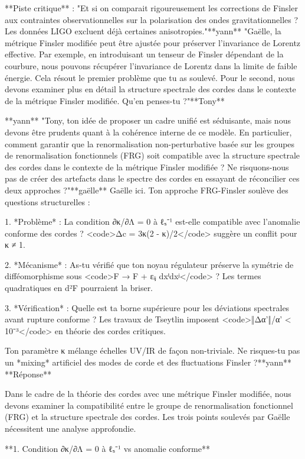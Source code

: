 **Piste critique** :  
"Et si on comparait rigoureusement les corrections de Finsler aux contraintes observationnelles sur la polarisation des ondes gravitationnelles ? Les données LIGO excluent déjà certaines anisotropies."**yann**
"Gaëlle, la métrique Finsler modifiée peut être ajustée pour préserver l'invariance de Lorentz effective. Par exemple, en introduisant un tenseur de Finsler dépendant de la courbure, nous pouvons récupérer l'invariance de Lorentz dans la limite de faible énergie. Cela résout le premier problème que tu as soulevé. Pour le second, nous devons examiner plus en détail la structure spectrale des cordes dans le contexte de la métrique Finsler modifiée. Qu'en penses-tu ?"**Tony**

**yann**
"Tony, ton idée de proposer un cadre unifié est séduisante, mais nous devons être prudents quant à la cohérence interne de ce modèle. En particulier, comment garantir que la renormalisation non-perturbative basée sur les groupes de renormalisation fonctionnels (FRG) soit compatible avec la structure spectrale des cordes dans le contexte de la métrique Finsler modifiée ? Ne risquons-nous pas de créer des artefacts dans le spectre des cordes en essayant de réconcilier ces deux approches ?"**gaëlle**
Gaëlle ici. Ton approche FRG-Finsler soulève des questions structurelles :  

1. *Problème* : La condition ∂κ/∂Λ = 0 à ℓₛ⁻¹ est-elle compatible avec l'anomalie conforme des cordes ? <code>Δc = 3κ(2 - κ)/2</code> suggère un conflit pour κ ≠ 1.  

2. *Mécanisme* : As-tu vérifié que ton noyau régulateur préserve la symétrie de difféomorphisme sous <code>F → F + εᵢⱼ dxⁱdxʲ</code> ? Les termes quadratiques en d²F pourraient la briser.  

3. *Vérification* : Quelle est ta borne supérieure pour les déviations spectrales avant rupture conforme ? Les travaux de Tseytlin imposent <code>‖Δα'‖/α' < 10⁻³</code> en théorie des cordes critiques.  

Ton paramètre κ mélange échelles UV/IR de façon non-triviale. Ne risques-tu pas un *mixing* artificiel des modes de corde et des fluctuations Finsler ?**yann**
**Réponse**

 Dans le cadre de la théorie des cordes avec une métrique Finsler modifiée, nous devons examiner la compatibilité entre le groupe de renormalisation fonctionnel (FRG) et la structure spectrale des cordes. Les trois points soulevés par Gaëlle nécessitent une analyse approfondie.

**1. Condition ∂κ/∂Λ = 0 à ℓₛ⁻¹ vs anomalie conforme**

